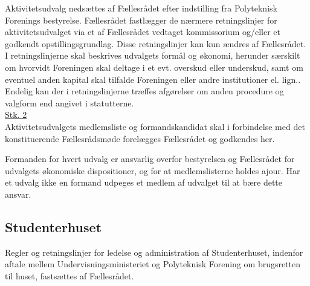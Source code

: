 \begin{list}
\item \label{L:Aktivitet:nedsaettelse} Aktivitetsudvalg nedsættes af Fællesrådet efter indstilling fra Polyteknisk Forenings bestyrelse. Fællesrådet fastlægger de nærmere retningslinjer for aktivitetsudvalget via et af Fællesrådet vedtaget kommissorium og/eller et godkendt opstillingsgrundlag. Disse retningslinjer kan kun ændres af Fællesrådet. I retningslinjerne skal beskrives udvalgets formål og økonomi, herunder særskilt om hvorvidt Foreningen skal deltage i et evt. overskud eller underskud, samt om eventuel anden kapital skal tilfalde Foreningen eller andre institutioner el. lign.. Endelig kan der i retningslinjerne træffes afgørelser om anden procedure og valgform end angivet i statutterne.\\

\underline{Stk. 2}\\
Aktivitetsudvalgets medlemsliste og formandskandidat skal i forbindelse med det konstituerende Fællesrådsmøde forelægges Fællesrådet og godkendes her.\\

\item Formanden for hvert udvalg er ansvarlig overfor bestyrelsen og Fællesrådet for udvalgets økonomiske dispositioner, og for at medlemslisterne holdes ajour. Har et udvalg ikke en formand udpeges et medlem af udvalget til at bære dette ansvar.
\subsection{Studenterhuset}
\item Regler og retningslinjer for ledelse og administration af Studenterhuset, indenfor aftale mellem Undervisningsministeriet og Polyteknisk Forening om brugsretten til huset, fastsættes af Fællesrådet.

\end{list}
